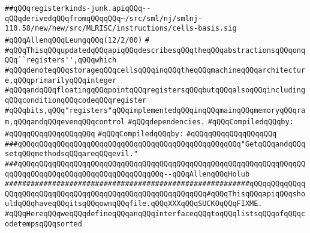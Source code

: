 \label{src/lib/compiler/back/low/code/registerkinds-junk.api}
\verb|##qQQqregisterkinds-junk.apiqQQq--qQQqderivedqQQqfromqQQqqQQq~/src/sml/nj/smlnj-110.58/new/new/src/MLRISC/instructions/cells-basis.sig|\newline
\verb|#qQQqAllenqQQqLeungqQQq(12/2/00)|\newline
\verb|#|\newline
\verb|#qQQqThisqQQqupdatedqQQqapiqQQqdescribesqQQqtheqQQqabstractionsqQQqonqQQq``registers'',qQQqwhich|\newline
\verb|#qQQqdenoteqQQqstorageqQQqcellsqQQqinqQQqtheqQQqmachineqQQqarchitecture,qQQqprimarilyqQQqinteger|\newline
\verb|#qQQqandqQQqfloatingqQQqpointqQQqregistersqQQqbutqQQqalsoqQQqincludingqQQqconditionqQQqcodeqQQqregister|\newline
\verb|#qQQqbits,qQQq"registers"qQQqimplementedqQQqinqQQqmainqQQqmemoryqQQqram,qQQqandqQQqevenqQQqcontrol|\newline
\verb|#qQQqdependencies.|\newline
\newline
\verb|#qQQqCompiledqQQqby:|\newline
\verb|#qQQqqQQqqQQqqQQqqQQq|\newline
\newline
\newline
\verb|#qQQqCompiledqQQqby:|\newline
\verb|#qQQqqQQqqQQqqQQqqQQq|\newline
\newline
\verb|###qQQqqQQqqQQqqQQqqQQqqQQqqQQqqQQqqQQqqQQqqQQqqQQqqQQq"GetqQQqandqQQqsetqQQqmethodsqQQqareqQQqevil."|\newline
\verb|###qQQqqQQqqQQqqQQqqQQqqQQqqQQqqQQqqQQqqQQqqQQqqQQqqQQqqQQqqQQqqQQqqQQqqQQqqQQqqQQqqQQqqQQqqQQqqQQqqQQqqQQq--qQQqAllenqQQqHolub|\newline
\newline
\newline
\verb|#########################################################qQQqqQQqqQQqqQQqqQQqqQQqqQQqqQQqqQQqqQQqqQQqqQQqqQQqqQQqqQQq#qQQqThisqQQqapiqQQqshouldqQQqhaveqQQqitsqQQqownqQQqfile.qQQqXXXqQQqSUCKOqQQqFIXME.|\newline
\verb|#qQQqHereqQQqweqQQqdefineqQQqanqQQqinterfaceqQQqtoqQQqlistsqQQqofqQQqcodetempsqQQqsorted|\newline
